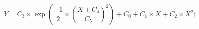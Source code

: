 \[
Y= C_3 \times  \exp (\frac{-1}{2} \times (\frac{X + C_4}{C_5})^2 )  + C_0 +  C_1 \times X  + C_2 \times  X^2;
\]
